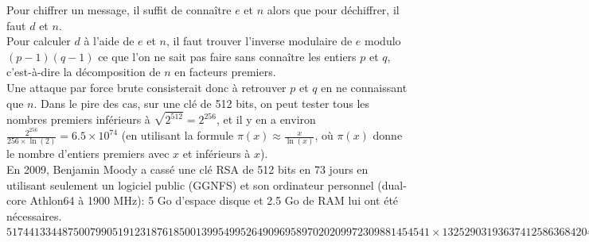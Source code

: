 \begin{itemize}
Pour chiffrer un message, il suffit de connaître $e$ et $n$ alors que pour déchiffrer, il faut $d$ et $n$. \\
Pour calculer $d$ à l'aide de $e$ et $n$, il faut trouver l'inverse modulaire de $e$ modulo $(p - 1)(q - 1)$ ce que l'on ne sait pas faire sans connaître les entiers $p$ et $q$, c'est-à-dire la décomposition de $n$ en facteurs premiers. \\
Une attaque par force brute consisterait donc à retrouver $p$ et $q$ en ne connaissant que $n$. Dans le pire des cas, sur une clé de 512 bits, on peut tester tous les nombres premiers inférieurs à $\sqrt{2^{512}} = 2^{256}$, et il y en a environ $\frac{2^{256}}{256 \times \ln(2)} = 6.5 \times 10^{74}$ (en utilisant la formule $\pi(x) \approx \frac{x}{\ln(x)}$, où $\pi(x)$ donne le nombre d'entiers premiers avec $x$ et inférieurs à $x$).\\
En 2009, Benjamin Moody a cassé une clé RSA de 512 bits en 73 jours en utilisant seulement un logiciel public (GGNFS) et son ordinateur personnel (dual-core Athlon64 à 1900 MHz): 5 Go d'espace disque et 2.5 Go de RAM lui ont été nécessaires. \\
$5174413344875007990519123187618500139954995264909695897020209972309881454541 \times 1325290319363741258636842042448323483211759628292406959481461131759210884908747 = 6857599914349403977654744967172758179904114264612947326127169976133296980951450542789808884504301075550786464802304019795402754670660318614966266413770127$





\end{itemize}
